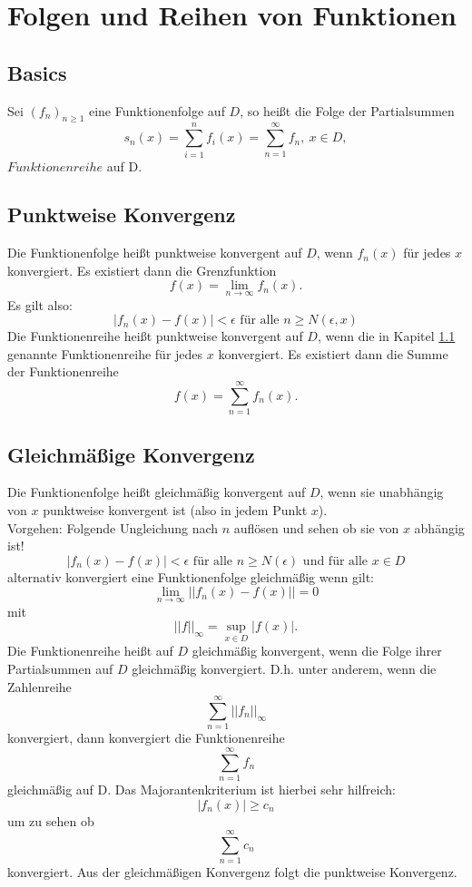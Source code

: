\documentclass[12pt,a4paper]{article}
\begin{document}

\section{Folgen und Reihen von Funktionen}
\subsection{Basics}\label{frfbasics}
Sei $(f_n)_{n\geq 1}$ eine Funktionenfolge auf $D$, so heißt die Folge der Partialsummen
\[s_n(x) = \sum\limits_{i=1}^{n}{f_i(x)} = \sum\limits_{n=1}^{\infty}{f_n} ,\ x \in D,\]
$Funktionenreihe$ auf D.

\subsection{Punktweise Konvergenz}
Die Funktionenfolge heißt punktweise konvergent auf $D$, wenn $f_n(x)$ für jedes $x$ konvergiert. Es existiert dann die Grenzfunktion
\[f(x) = \lim\limits_{n \to \infty}{f_n(x)} \text{.}\]
Es gilt also:
\[\left| f_n(x) - f(x)\right| < \epsilon \text{ für alle } n \geq N(\epsilon, x)\]
Die Funktionenreihe heißt punktweise konvergent auf $D$, wenn die in Kapitel \ref{frfbasics} genannte Funktionenreihe für jedes $x$ konvergiert. Es existiert dann die Summe der Funktionenreihe
\[f(x) = \sum\limits_{n=1}^{\infty}{f_n(x)} \text{.}\]

\subsection{Gleichmäßige Konvergenz}
Die Funktionenfolge heißt gleichmäßig konvergent auf $D$, wenn sie unabhängig von $x$ punktweise konvergent ist (also in jedem Punkt $x$). \\
Vorgehen: Folgende Ungleichung nach $n$ auflösen und sehen ob sie von $x$ abhängig ist!
\[\left| f_n(x) - f(x)\right| < \epsilon \text{ für alle } n\geq N(\epsilon) \text{ und für alle } x \in D\]
alternativ konvergiert eine Funktionenfolge gleichmäßig wenn gilt:
\[\lim\limits_{n \to \infty}{\left|\left| f_n(x) - f(x)\right|\right| = 0}\]
mit
\[\left|\left| f\right|\right|_{\infty} = \sup\limits_{x \in D}{\left| f(x)\right|} \text{.}\]
Die Funktionenreihe heißt auf $D$ gleichmäßig konvergent, wenn die Folge ihrer Partialsummen auf $D$ gleichmäßig konvergiert. D.h. unter anderem, wenn die Zahlenreihe
\[\sum\limits_{n=1}^{\infty}{\left| \left| f_n\right| \right|_{\infty}}\]
konvergiert, dann konvergiert die Funktionenreihe
\[\sum\limits_{n=1}^{\infty}{f_n}\]
gleichmäßig auf D. Das Majorantenkriterium ist hierbei sehr hilfreich:
\[\left|f_n(x)\right| \geq c_n\]
um zu sehen ob 
\[\sum\limits_{n=1}^{\infty}{c_n}\]
konvergiert.
Aus der gleichmäßigen Konvergenz folgt die punktweise Konvergenz.
\end{document}
